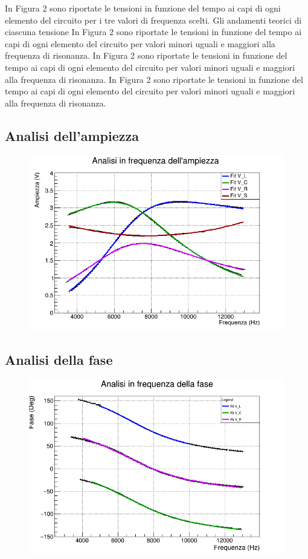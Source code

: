 \documentclass{article}
\begin{document}
In Figura 2 sono riportate le tensioni in funzione del tempo ai capi di ogni elemento del circuito per i tre valori di frequenza scelti. Gli andamenti teorici di ciascuna tensione 
In Figura 2 sono riportate le tensioni in funzione del tempo ai capi di ogni elemento del circuito per valori minori uguali e maggiori alla frequenza di risonanza. 
In Figura 2 sono riportate le tensioni in funzione del tempo ai capi di ogni elemento del circuito per valori minori uguali e maggiori alla frequenza di risonanza. 
In Figura 2 sono riportate le tensioni in funzione del tempo ai capi di ogni elemento del circuito per valori minori uguali e maggiori alla frequenza di risonanza. 

\subsection{Analisi dell'ampiezza}
\begin{figure}[h]
  \centering
  \includegraphics[scale=0.45]{AmpFreq.png}
\end{figure}
\subsection{Analisi della fase}
\begin{figure}[h]
  \centering
  \includegraphics[scale=0.45]{FaseFreq.png}
\end{figure}
\end{document}
